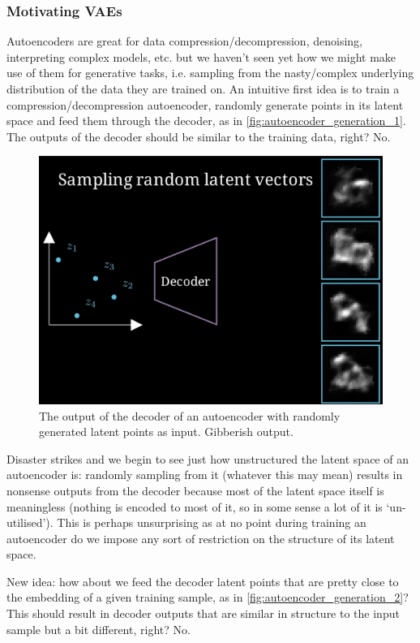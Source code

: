 \documentclass[11pt]{article}
\begin{document}
\subsubsection{Motivating VAEs}
Autoencoders are great for data compression/decompression, denoising, interpreting complex models, etc. but we haven't seen yet how we might make use of them for generative tasks, i.e. sampling from the nasty/complex underlying distribution of the data they are trained on. An intuitive first idea is to train a compression/decompression autoencoder, randomly generate points in its latent space and feed them through the decoder, as in \autoref{fig:autoencoder_generation_1}. The outputs of the decoder should be similar to the training data, right? No.

\begin{figure}[t]
    \centering
    \includegraphics[width=0.60\columnwidth]{./figures/generative_models/AE_gen_1.png}
    \caption{The output of the decoder of an autoencoder with randomly generated latent points as input. Gibberish output. }
    \label{fig:autoencoder_generation_1}
\end{figure}

\noindent Disaster strikes and we begin to see just how unstructured the latent space of an autoencoder is: randomly sampling from it (whatever this may mean) results in nonsense outputs from the decoder because most of the latent space itself is meaningless (nothing is encoded to most of it, so in some sense a lot of it is `un-utilised'). This is perhaps unsurprising as at no point during training an autoencoder do we impose any sort of restriction on the structure of its latent space.

New idea: how about we feed the decoder latent points that are pretty close to the embedding of a given training sample, as in \autoref{fig:autoencoder_generation_2}? This should result in decoder outputs that are similar in structure to the input sample but a bit different, right? No.
\end{document}

